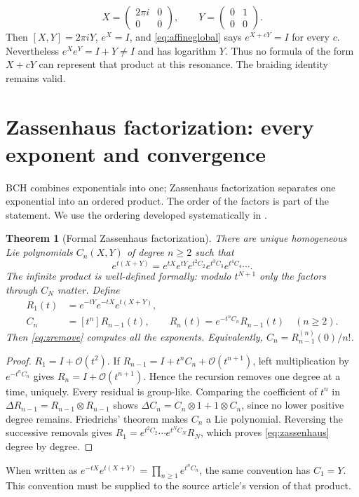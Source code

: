 \documentclass[11pt]{article}
\newtheorem{theorem}{Theorem}[section]
\theoremstyle{definition}
\theoremstyle{remark}
\newcommand{\smallO}{\mathcal O}
\numberwithin{equation}{section}
\begin{document}
\[
 X=\begin{pmatrix}2\pi i&0\\0&0\end{pmatrix},\qquad
 Y=\begin{pmatrix}0&1\\0&0\end{pmatrix}.
\]
Then $[X,Y]=2\pi iY$, $e^X=I$, and \eqref{eq:affineglobal} says $e^{X+cY}=I$ for every $c$. Nevertheless $e^Xe^Y=I+Y\ne I$ and has logarithm $Y$. Thus no formula of the form $X+cY$ can represent that product at this resonance. The braiding identity remains valid.

\section{Zassenhaus factorization: every exponent and convergence}\label{sec:zassenhaus}
BCH combines exponentials into one; Zassenhaus factorization separates one exponential into an ordered product. The order of the factors is part of the statement. We use the ordering developed systematically in \cite{casas}.
\begin{theorem}[Formal Zassenhaus factorization]\label{thm:zassenhaus}
There are unique homogeneous Lie polynomials $C_n(X,Y)$ of degree $n\geq2$ such that
\begin{equation}\label{eq:zassenhaus}
 e^{t(X+Y)}=e^{tX}e^{tY}
                e^{t^2C_2}e^{t^3C_3}e^{t^4C_4}\cdots.
\end{equation}
The infinite product is well-defined formally: modulo $t^{N+1}$ only the factors through $C_N$ matter. Define
\begin{align}
 R_1(t)&=e^{-tY}e^{-tX}e^{t(X+Y)},\label{eq:zresidual}\\
 C_n&=[t^n]R_{n-1}(t),\qquad
 R_n(t)=e^{-t^nC_n}R_{n-1}(t)\quad(n\geq2).\label{eq:zremove}
\end{align}
Then \eqref{eq:zremove} computes all the exponents. Equivalently,
$C_n=R_{n-1}^{(n)}(0)/n!$.
\end{theorem}
\begin{proof}
$R_1=I+\smallO(t^2)$. If $R_{n-1}=I+t^nC_n+\smallO(t^{n+1})$, left multiplication by $e^{-t^nC_n}$ gives $R_n=I+\smallO(t^{n+1})$. Hence the recursion removes one degree at a time, uniquely. Every residual is group-like. Comparing the coefficient of $t^n$ in
$\Delta R_{n-1}=R_{n-1}\otimes R_{n-1}$ shows
$\Delta C_n=C_n\otimes1+1\otimes C_n$, since no lower positive degree remains. Friedrichs' theorem makes $C_n$ a Lie polynomial. Reversing the successive removals gives
$R_1=e^{t^2C_2}\cdots e^{t^NC_N}R_N$, which proves \eqref{eq:zassenhaus} degree by degree.
\end{proof}
When written as $e^{-tX}e^{t(X+Y)}=\prod_{n\geq1}e^{t^nC_n}$, the same convention has $C_1=Y$. This convention must be supplied to the source article's version of that product.
\end{document}
